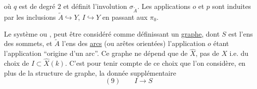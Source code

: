 où $q$ est de degré $2$ et définit l'involution $\sigma_{\widetilde A}$. Les applications $o$ et $p$ sont induites par les inclusions $\widetilde A\hookrightarrow Y$, $I\hookrightarrow Y$ en passant aux $\pi_0$.

Le système
ou
, peut être considéré comme définissant un \uline{graphe}, dont $S$ est l'ens des sommets, et $\widetilde A$ l'ens des \uline{arcs} (ou arêtes orientées) l'application $o$ étant l'application ``origine d'un arc''. Ce graphe ne dépend que de $\widehat X$, pas de $X$ i.e. du choix de $I\subset\widehat X(k)$. C'est pour tenir compte de ce choix que l'on considère, en plus de la structure de graphe, la donnée supplémentaire
\[
(9)\qquad I\longrightarrow S
\]

